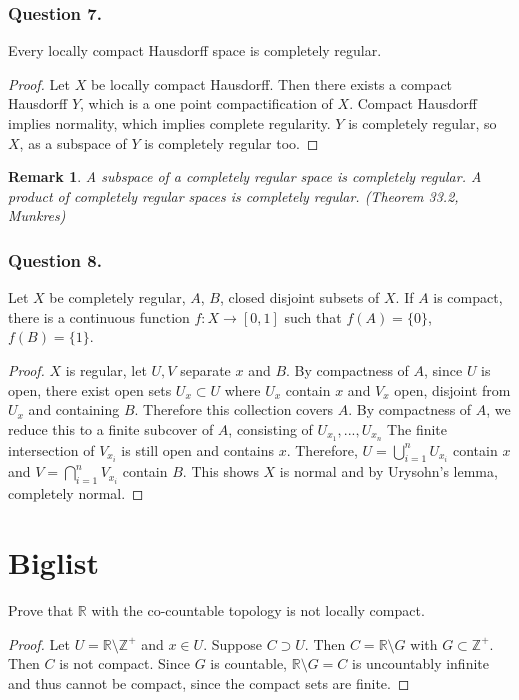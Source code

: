 \documentclass[12pt]{article}
\newtheorem{remark}{Remark}
\begin{document}
\subsubsection*{Question 7.}
Every locally compact Hausdorff space is completely regular.
\begin{proof}
    Let $X$ be locally compact Hausdorff. Then there exists 
    a compact Hausdorff $Y$, which is a one point compactification of 
    $X$. Compact Hausdorff implies normality, which implies complete regularity.
    $Y$ is completely regular, so $X$, as a subspace of $Y$ is completely regular too.
\end{proof}
\begin{remark}
    A subspace of a completely regular space is completely regular. A
product of completely regular spaces is completely regular. (Theorem 33.2, Munkres)
\end{remark}

\subsubsection*{Question 8.} Let $X$ be completely regular, $A$, $B$, closed 
disjoint subsets of $X$. If $A$ is compact, there is a continuous 
function $f: X \rightarrow [0, 1]$ such that $f(A) = \{0\}$, $f(B) = \{1\}$.
\begin{proof}

    $X$ is regular, let $U, V$ separate $x$ and $B$. By compactness of $A$,
    since $U$ is open, there exist open sets $U_x \subset U$ where $U_x$ contain $x$
    and $V_x$ open, disjoint from $U_x$ and containing $B$.
    Therefore this collection covers $A$. By compactness of $A$, 
    we reduce this to a finite subcover of $A$, consisting of $U_{x_1}, ..., U_{x_n}$
    The finite intersection of $V_{x_i}$ is still open and contains $x$. Therefore,
    $U = \bigcup_{i=1}^n U_{x_i}$ contain $x$ and $V = \bigcap_{i=1}^n V_{x_i}$ contain $B$.
    This shows $X$ is normal and by Urysohn's lemma, completely normal.

\end{proof}


\section{Biglist}
Prove that $\mathbb{R}$ with the co-countable topology is
not locally compact.

\begin{proof}
    Let
    $U = \mathbb{R} \setminus \mathbb{Z}^+$ and $x \in U$.
    Suppose $C \supset U$. Then $C = \mathbb{R} \setminus G$
    with $G \subset \mathbb{Z}^+$. Then $C$ is not compact.
    Since $G $ is countable, $\mathbb{R}\setminus G = C$ is uncountably infinite and thus cannot 
    be compact, since the compact sets are finite.

\end{proof}
\end{document}
